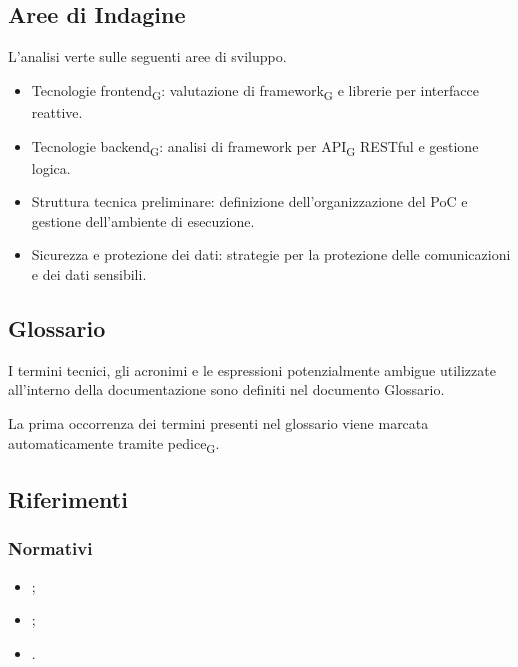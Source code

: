 \subsection{Aree di Indagine}
L’analisi verte sulle seguenti aree di sviluppo.
\begin{itemize}
    \item Tecnologie frontend\textsubscript{G}: valutazione di framework\textsubscript{G} e librerie per interfacce reattive.
    \item Tecnologie backend\textsubscript{G}: analisi di framework per API\textsubscript{G} RESTful e gestione logica.
    \item Struttura tecnica preliminare: definizione dell'organizzazione del PoC e gestione dell'ambiente di esecuzione.    
    \item Sicurezza e protezione dei dati: strategie per la protezione delle comunicazioni e dei dati sensibili.
\end{itemize}


\subsection{Glossario}

I termini tecnici, gli acronimi e le espressioni potenzialmente ambigue utilizzate all'interno della documentazione sono definiti nel documento
{Glossario}.

La prima occorrenza dei termini presenti nel glossario viene marcata automaticamente tramite pedice\textsubscript{G}.


\subsection{Riferimenti}

\subsubsection{Normativi}

\begin{itemize}
    \item {};

    \item {};

    \item {}.
\end{itemize}

